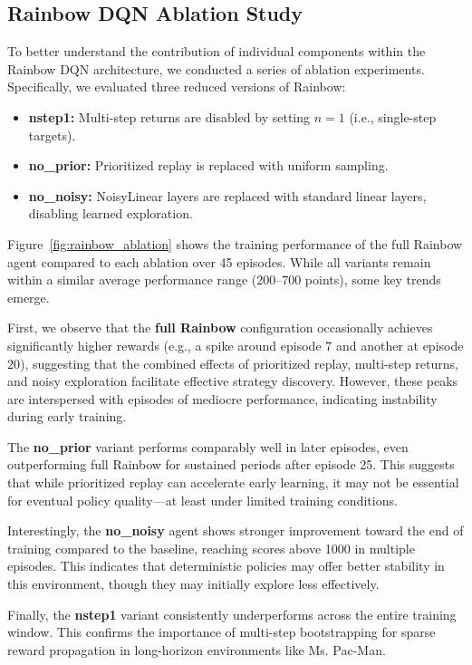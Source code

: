 \documentclass{article}
\begin{document}
\subsection{Rainbow DQN Ablation Study}

To better understand the contribution of individual components within the Rainbow DQN architecture, we conducted a series of ablation experiments. Specifically, we evaluated three reduced versions of Rainbow:
\begin{itemize}
    \item \textbf{nstep1:} Multi-step returns are disabled by setting $n=1$ (i.e., single-step targets).
    \item \textbf{no\_prior:} Prioritized replay is replaced with uniform sampling.
    \item \textbf{no\_noisy:} NoisyLinear layers are replaced with standard linear layers, disabling learned exploration.
\end{itemize}

Figure~\ref{fig:rainbow_ablation} shows the training performance of the full Rainbow agent compared to each ablation over 45 episodes. While all variants remain within a similar average performance range (200–700 points), some key trends emerge.

First, we observe that the \textbf{full Rainbow} configuration occasionally achieves significantly higher rewards (e.g., a spike around episode 7 and another at episode 20), suggesting that the combined effects of prioritized replay, multi-step returns, and noisy exploration facilitate effective strategy discovery. However, these peaks are interspersed with episodes of mediocre performance, indicating instability during early training.

The \textbf{no\_prior} variant performs comparably well in later episodes, even outperforming full Rainbow for sustained periods after episode 25. This suggests that while prioritized replay can accelerate early learning, it may not be essential for eventual policy quality—at least under limited training conditions.

Interestingly, the \textbf{no\_noisy} agent shows stronger improvement toward the end of training compared to the baseline, reaching scores above 1000 in multiple episodes. This indicates that deterministic policies may offer better stability in this environment, though they may initially explore less effectively.

Finally, the \textbf{nstep1} variant consistently underperforms across the entire training window. This confirms the importance of multi-step bootstrapping for sparse reward propagation in long-horizon environments like Ms. Pac-Man.
\end{document}
